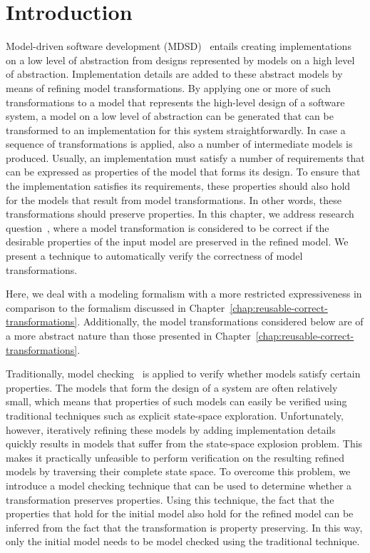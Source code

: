 \section{Introduction}
\label{sec:lts-transformation:intro}
Model-driven software development (MDSD)~\cite{mdsd} entails creating implementations on a low level of abstraction from designs represented by models on a high level of abstraction.
Implementation details are added to these abstract models by means of refining model transformations.
By applying one or more of such transformations to a model that represents the high-level design of a software system, a model on a low level of abstraction can be generated that can be transformed to an implementation for this system straightforwardly.
In case a sequence of transformations is applied, also a number of intermediate models is produced.
Usually, an implementation must satisfy a number of requirements that can be expressed as properties of the model that forms its design.
To ensure that the implementation satisfies its requirements, these properties should also hold for the models that result from model transformations.
In other words, these transformations should preserve properties.
In this chapter, we address research question~, where a model transformation is considered to be correct if the desirable properties of the input model are preserved in the refined model.
We present a technique to automatically verify the correctness of model transformations.

\RQSix

\noindent
Here, we deal with a modeling formalism with a more restricted expressiveness in comparison to the formalism discussed in Chapter~\ref{chap:reusable-correct-transformations}.
Additionally, the model transformations considered below are of a more abstract nature than those presented in Chapter~\ref{chap:reusable-correct-transformations}.

Traditionally, model checking~\cite{Clarke1999} is applied to verify whether models satisfy certain properties.
The models that form the design of a system are often relatively small, which means that properties of such models can easily be verified using traditional techniques such as explicit state-space exploration.
Unfortunately, however, iteratively refining these models by adding implementation details quickly results in models that suffer from the state-space explosion problem.
This makes it practically unfeasible to perform verification on the resulting refined models by traversing their complete state space.
To overcome this problem, we introduce a model checking technique that can be used to determine whether a transformation preserves properties.
Using this technique, the fact that the properties that hold for the initial model also hold for the refined model can be inferred from the fact that the transformation is property preserving.
In this way, only the initial model needs to be model checked using the traditional technique.

